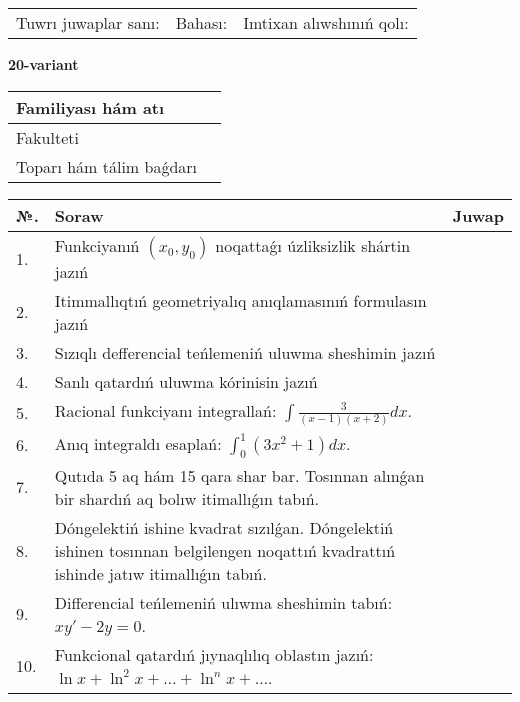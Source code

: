 \documentclass{article}
\begin{document}
\vspace{1cm}

\begin{tabular}{ c c c }
Tuwrı juwaplar sanı: \underline{\hspace{2cm}} & Bahası: \underline{\hspace{2cm}} & Imtixan alıwshınıń qolı: \underline{\hspace{2cm}} \\
\end{tabular}

\newpage

\begin{center}\textbf{20-variant}\end{center}

\bgroup
\def\arraystretch{1.5}
\begin{tabular}{ |m{6cm}|m{10cm}| }
  \hline
  Familiyası hám atı & \\
  \hline
  Fakulteti &\\
  \hline
  Toparı hám tálim baǵdarı & \\
  \hline
\end{tabular}
\egroup

\vspace{0.5cm}

\bgroup
\def\arraystretch{2}
\begin{tabular}{ |l|m{8cm}|m{7cm}| }
  \hline
  №. & Soraw & Juwap \\
  \hline
  1. & Funkciyanıń $(x_{0}, y_{0})$ noqattaǵı úzliksizlik shártin jazıń &  \\
  \hline
  2. & Itimmallıqtıń geometriyalıq anıqlamasınıń formulasın jazıń &  \\
  \hline
  3. & Sızıqlı defferencial teńlemeniń uluwma sheshimin jazıń &  \\
  \hline
  4. & Sanlı qatardıń uluwma kórinisin jazıń &  \\
  \hline
  5. & Racional funkciyanı integrallań: $\displaystyle\int {\frac{3}{(x - 1)(x + 2)}dx}$. &  \\
  \hline
  6. & Anıq integraldı esaplań: $\displaystyle\int_{0}^{1}{(3x^{2} + 1)dx}$. &  \\
  \hline
  7. & Qutıda 5 aq hám 15 qara shar bar. Tosınnan alınǵan bir shardıń aq bolıw itimallıǵın tabıń. &  \\
  \hline
  8. & Dóngelektiń ishine kvadrat sızılǵan. Dóngelektiń ishinen tosınnan belgilengen noqattıń kvadrattıń ishinde jatıw itimallıǵın tabıń. &  \\
  \hline
  9. & Differencial teńlemeniń ulıwma sheshimin tabıń: $xy' - 2y = 0$. &  \\
  \hline
  10. & Funkcional qatardıń jıynaqlılıq oblastın jazıń: $\ln x + \ln^{2}x + \ldots + \ln^{n}x + \ldots$. &  \\
  \hline
\end{tabular}
\egroup
\end{document}
